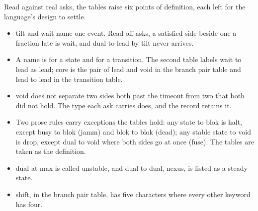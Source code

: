 Read against real asks, the tables raise six points of definition, each left for the language's
design to settle.
\begin{itemize}
\item tilt and wait name one event. Read off asks, a satisfied side beside one a fraction late is
  wait, and dual to lead by tilt never arrives.
\item A name is for a state and for a transition. The second table labels wait to lead as
  lead; core is the pair of lead and void in the branch pair table and lead to lead in the transition table.
\item void does not separate two sides both past the timeout from two that both did not hold.
  The type each ask carries does, and the record retains it.
\item Two prose rules carry exceptions the tables hold: any state to blok is halt, except busy to
  blok (jamm) and blok to blok (dead); any stable state to void is drop, except dual to void where
  both sides go at once (fuse). The tables are taken as the definition.
\item dual at max is called unstable, and dual to dual, nexus, is listed as a steady state.
\item shift, in the branch pair table, has five characters where every other keyword has four.
\end{itemize}
